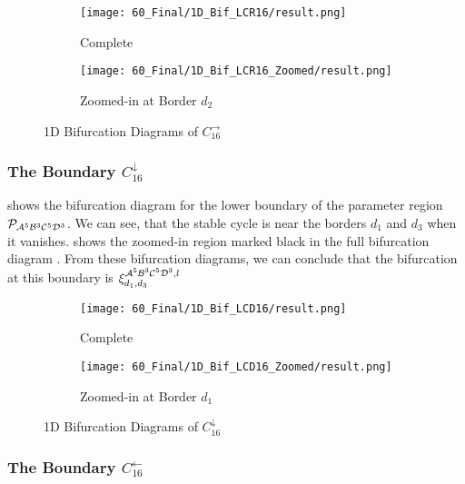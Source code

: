 \begin{figure}
    \centering
    \begin{subfigure}{0.4\textwidth}
        \centering
        \texttt{[image: 60\_Final/1D\_Bif\_LCR16/result.png]}
        \caption{Complete}
        \label{fig:final.bifurcation.C.right}
    \end{subfigure}
    \begin{subfigure}{0.4\textwidth}
        \centering
        \texttt{[image: 60\_Final/1D\_Bif\_LCR16\_Zoomed/result.png]}
        \caption{Zoomed-in at Border $d_2$}
        \label{fig:final.bifurcation.C.right.zoomed}
    \end{subfigure}
    \caption{1D Bifurcation Diagrams of $C_{16}^\rightarrow$}
\end{figure}

\subsubsection{The Boundary $C_{16}^\downarrow$}

 shows the bifurcation diagram for the lower boundary of the parameter region $\mathcal{P}_{\mathcal{A}^5\mathcal{B}^3\mathcal{C}^5\mathcal{D}^3}$.
We can see, that the stable cycle is near the borders $d_1$ and $d_3$ when it vanishes.
 shows the zoomed-in region marked black in the full bifurcation diagram .
From these bifurcation diagrams, we can conclude that the bifurcation at this boundary is $\xi_{d_1, d_3}^{\mathcal{A}^5\mathcal{B}^3\mathcal{C}^5\mathcal{D}^3, l}$

\begin{figure}
    \centering
    \begin{subfigure}{0.4\textwidth}
        \centering
        \texttt{[image: 60\_Final/1D\_Bif\_LCD16/result.png]}
        \caption{Complete}
        \label{fig:final.bifurcation.C.down}
    \end{subfigure}
    \begin{subfigure}{0.4\textwidth}
        \centering
        \texttt{[image: 60\_Final/1D\_Bif\_LCD16\_Zoomed/result.png]}
        \caption{Zoomed-in at Border $d_1$}
        \label{fig:final.bifurcation.C.down.zoomed}
    \end{subfigure}
    \caption{1D Bifurcation Diagrams of $C_{16}^\downarrow$}
\end{figure}

\subsubsection{The Boundary $C_{16}^\leftarrow$}

